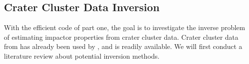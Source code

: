 

\subsection{Crater Cluster Data Inversion}
\label{sec:goal2}
With the efficient code of part one, the goal is to investigate the inverse problem of estimating impactor properties from crater cluster data.
Crater cluster data from \cite{daubar2019recently} has already been used by \cite{newland2019CFM18}, and is readily available.
We will first conduct a literature review about potential inversion methods.

